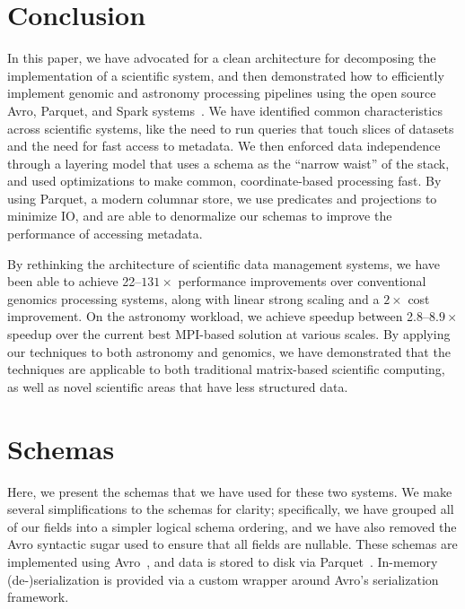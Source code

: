 \documentclass{acm_proc_article-sp}
\begin{document}
\section{Conclusion}
\label{sec:conclusion}

In this paper, we have advocated for a clean architecture for decomposing the implementation of a scientific
system, and then demonstrated how to efficiently implement genomic and astronomy processing pipelines using
the open source Avro, Parquet, and Spark systems~\cite{avro, parquet, zaharia10}. We have identified common
characteristics across scientific systems, like the need to run queries that touch slices of datasets and the need
for fast access to metadata. We then enforced data independence through a layering model that uses a schema
as the ``narrow waist'' of the stack, and used optimizations to make common, coordinate-based processing
fast. By using Parquet, a modern columnar store, we use predicates and projections to minimize IO, and are able
to denormalize our schemas to improve the performance of accessing metadata.

By rethinking the architecture of scientific data management systems, we have been able to achieve
22--$131\times$ performance improvements over conventional genomics processing systems, along with linear
strong scaling and a $2\times$ cost improvement. On the astronomy workload, we achieve speedup between
2.8--$8.9\times$ speedup over the current best MPI-based solution at various scales. By applying our techniques
to both astronomy and genomics, we have demonstrated that the techniques are applicable to both traditional
matrix-based scientific computing, as well as novel scientific areas that have less structured data.

\balance

\clearpage

\appendix


 

\section{Schemas}
\label{sec:schema}

Here, we present the schemas that we have used for these two systems. We make several
simplifications to the schemas for clarity; specifically, we have grouped all of our fields into a simpler
logical schema ordering, and we have also removed the Avro syntactic sugar used to ensure that all
fields are nullable. These schemas are implemented using Avro~\cite{avro}, and data is stored to disk via
Parquet~\cite{parquet}. In-memory (de-)serialization is provided via a custom wrapper around Avro's
serialization framework.
\end{document}
